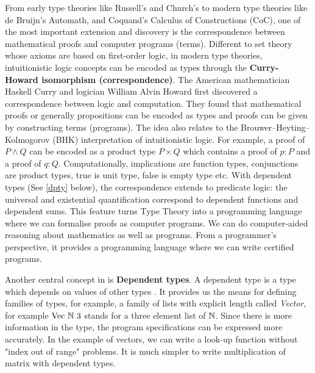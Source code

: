 From early type theories like Russell's and Church's to modern type theories like de Bruijn's Automath, \mltt and Coquand's Calculus of Constructions (CoC), one of the most important extension and discovery is the correspondence between mathematical proofs and computer programs (terms).
Different to set theory whose axioms are based on first-order logic, in modern type theories, intuitionistic logic concepts can be encoded as types through the 
\textbf{Curry-Howard isomorphism (correspondence)}.
The American mathematician Haskell Curry and logician William Alvin Howard first discovered a correspondence between logic and computation. They found that mathematical proofs or generally propositions can be encoded as types and proofs can be given by constructing terms (programs). The idea also relates to the Brouwer–Heyting–Kolmogorov (BHK) interpretation of intuitionistic logic. For example, a proof of $P \wedge Q$ can be encoded as a product type $P \times Q$ which contains a proof of $p : P$ and a proof of $q : Q$. Computationally, implications are function types, conjunctions are product types, true is unit type, false is empty type etc. 
With dependent types (See \ref{dpty} below), the correspondence extends to predicate logic: the universal and existential quantification correspond to dependent functions and dependent sums. 
This feature turns Type Theory into a programming language where we can formalise proofs as computer programs. We can do computer-aided reasoning about mathematics as well as programs. From a programmer's perspective, it provides a programming language where we can write certified programs.


Another central concept in \mltt is \textbf{Dependent types}\label{dpty}.
A dependent type is a type which depends on values of other types \cite{dtw}. It provides us the means for defining families of types, for example, a family of lists with explicit length called \emph{Vector}, for example $\text{Vec} ~\mathbb{N} ~3$ stands for a three element list of $\mathbb{N}$. Since there is more information in the type, the program specifications can be expressed more accurately. In the example of vectors, we can write a look-up function without "index out of range" problems. It is much simpler to write multiplication of matrix with dependent types.


